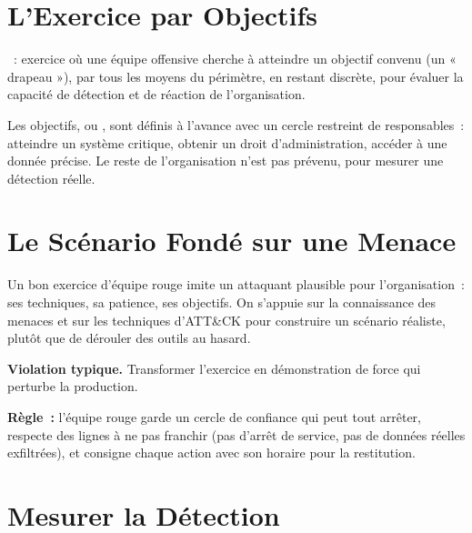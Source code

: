 \section{L'Exercice par Objectifs}
\label{sec:c20-objectifs}

\begin{boxdef}
~: exercice où une équipe offensive cherche à
atteindre un objectif convenu (un « drapeau »), par tous les moyens du
périmètre, en restant discrète, pour évaluer la capacité de détection et de
réaction de l'organisation.
\end{boxdef}

Les objectifs, ou , sont définis à l'avance avec un cercle
restreint de responsables~: atteindre un système critique, obtenir un droit
d'administration, accéder à une donnée précise. Le reste de l'organisation
n'est pas prévenu, pour mesurer une détection réelle.

\section{Le Scénario Fondé sur une Menace}
\label{sec:c20-menace}

Un bon exercice d'équipe rouge imite un attaquant plausible pour
l'organisation~: ses techniques, sa patience, ses objectifs. On s'appuie sur
la connaissance des menaces et sur les techniques d'ATT\&CK pour construire
un scénario réaliste, plutôt que de dérouler des outils au hasard.

\begin{boxalert}
\textbf{Violation typique.} Transformer l'exercice en démonstration de
force qui perturbe la production.

\smallskip
\textbf{Règle~:} l'équipe rouge garde un cercle de confiance qui peut tout
arrêter, respecte des lignes à ne pas franchir (pas d'arrêt de service, pas
de données réelles exfiltrées), et consigne chaque action avec son horaire
pour la restitution.
\end{boxalert}

\section{Mesurer la Détection}
\label{sec:c20-detection}

